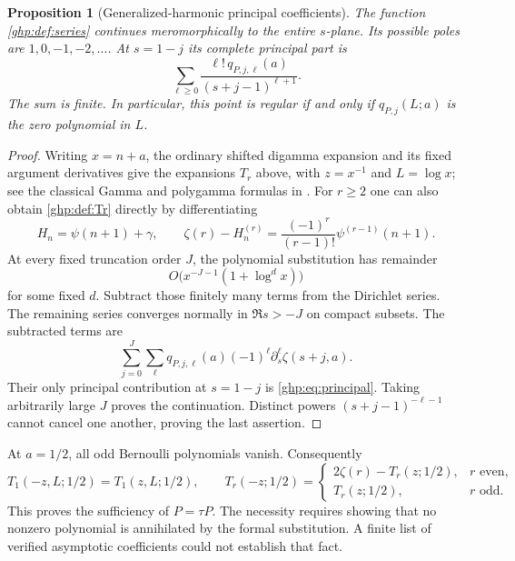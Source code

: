 \documentclass[11pt,a4paper]{article}
\numberwithin{equation}{section}
\newtheorem{proposition}[theorem]{Proposition}
\theoremstyle{definition}
\theoremstyle{remark}
\begin{document}
\begin{proposition}[Generalized-harmonic principal coefficients]
\label{ghp:prop:principal}
The function \eqref{ghp:def:series} continues meromorphically to the
entire $s$-plane. Its possible poles are $1,0,-1,-2,\ldots$. At
$s=1-j$ its complete principal part is
\begin{equation}\label{ghp:eq:principal}
 \sum_{\ell\geq0}\frac{\ell!\,q_{P,j,\ell}(a)}{(s+j-1)^{\ell+1}}.
\end{equation}
The sum is finite. In particular, this point is regular if and only if
$q_{P,j}(L;a)$ is the zero polynomial in $L$.
\end{proposition}

\begin{proof}
Writing $x=n+a$, the ordinary shifted digamma expansion and its fixed
argument derivatives give the expansions $T_r$ above, with $z=x^{-1}$
and $L=\log x$; see the classical Gamma and polygamma formulas in
\cite[\S\S5.11, 5.15]{DLMF}. For $r\geq2$ one can also obtain
\eqref{ghp:def:Tr} directly by differentiating
\[
 H_n=\psi(n+1)+\gamma,
 \qquad
 \zeta(r)-H_n^{(r)}=
       \frac{(-1)^r}{(r-1)!}\psi^{(r-1)}(n+1).
\]
At every fixed truncation order $J$, the polynomial substitution has
remainder
\[
 O\bigl(x^{-J-1}(1+\log^d x)\bigr)
\]
for some fixed $d$.
Subtract those finitely many terms from the Dirichlet series. The
remaining series converges normally in $\Re s>-J$ on compact subsets.
The subtracted terms are
\[
 \sum_{j=0}^J\sum_\ell
   q_{P,j,\ell}(a)(-1)^\ell\partial_s^\ell\zeta(s+j,a).
\]
Their only principal contribution at $s=1-j$ is
\eqref{ghp:eq:principal}. Taking arbitrarily large $J$ proves the
continuation. Distinct powers $(s+j-1)^{-\ell-1}$ cannot cancel one
another, proving the last assertion.
\end{proof}

At $a=1/2$, all odd Bernoulli polynomials vanish. Consequently
\begin{equation}\label{ghp:eq:formal-parity}
 T_1(-z,L;1/2)=T_1(z,L;1/2),\qquad
 T_r(-z;1/2)=\begin{cases}
  2\zeta(r)-T_r(z;1/2),&r\text{ even},\\
  T_r(z;1/2),&r\text{ odd}.
 \end{cases}
\end{equation}
This proves the sufficiency of $P=\tau P$. The necessity requires
showing that no nonzero polynomial is annihilated by the formal
substitution. A finite list of verified asymptotic coefficients could
not establish that fact.
\end{document}

